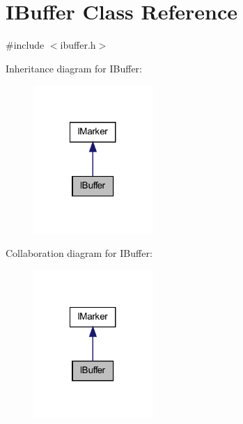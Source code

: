 \hypertarget{class_i_buffer}{
\section{IBuffer Class Reference}
\label{class_i_buffer}
}


{\ttfamily \#include $<$ibuffer.h$>$}



Inheritance diagram for IBuffer:\nopagebreak
\begin{figure}[H]
\begin{center}
\leavevmode
\includegraphics[width=128pt]{class_i_buffer__inherit__graph}
\end{center}
\end{figure}


Collaboration diagram for IBuffer:\nopagebreak
\begin{figure}[H]
\begin{center}
\leavevmode
\includegraphics[width=128pt]{class_i_buffer__coll__graph}
\end{center}
\end{figure}
